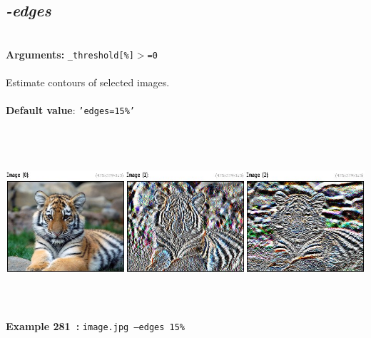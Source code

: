 \documentclass[a4paper,11pt,twoside]{book}
\begin{document}
\subsection{\emph{-edges} }\vspace*{-0.5em}
~\\\textbf{Arguments: } 
{\small \texttt{\_threshold[\%]$>$=0}}\\~\\
Estimate contours of selected images.
~\\~\\\textbf{Default value}: {\small \texttt{'edges=15\%'}}
\begin{center}\includegraphics[keepaspectratio=true,height=7cm,width=\textwidth]{img/gmic_def281.jpg}\\
{\footnotesize \textbf{Example 281~:} \texttt{image.jpg --edges 15\%}}
\end{center}
\end{document}
